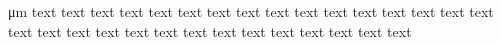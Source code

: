 \documentclass{article}
\begin{document}
\si{\micro\metre}
text text text text text text text text text text text text text text text
text text text text text text text text text text text text text text text
\end{document}
